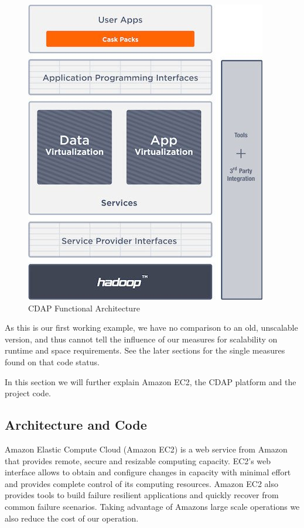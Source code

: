 \documentclass[
10pt, %
a4paper, %
oneside, %
headinclude,footinclude, %
useAMS,
usenatbib
]{mn2e}  %
\begin{document}
\begin{figure}
    \centering
    \includegraphics[width=0.95\columnwidth]{cdap_architecture}
    \caption{CDAP Functional Architecture}
    \label{fig:cdap}
\end{figure}

As this is our first working example, we have no comparison to an old, unscalable version, and thus cannot tell the influence of our measures for scalability on runtime and space requirements. See the later sections for the single measures found on that code status.


In this section we will further explain Amazon EC2, the CDAP platform and the project code.


\subsection{Architecture and Code}
Amazon Elastic Compute Cloud (Amazon EC2) is a web service from Amazon that provides remote, secure and resizable computing capacity. EC2’s web interface allows to obtain and configure changes in capacity with minimal effort and provides complete control of its computing resources. Amazon EC2 also provides tools to build failure resilient applications and quickly recover from common failure scenarios. Taking advantage of Amazons large scale operations we also reduce the cost of our operation.
\end{document}
